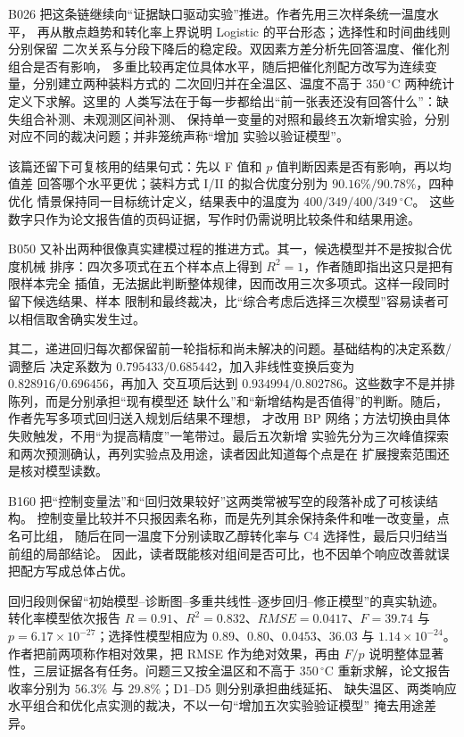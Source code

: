 B026 把这条链继续向“证据缺口驱动实验”推进。作者先用三次样条统一温度水平，
再从散点趋势和转化率上界说明 Logistic 的平台形态；选择性和时间曲线则分别保留
二次关系与分段下降后的稳定段。双因素方差分析先回答温度、催化剂组合是否有影响，
多重比较再定位具体水平，随后把催化剂配方改写为连续变量，分别建立两种装料方式的
二次回归并在全温区、温度不高于 $350\,^{\circ}\mathrm{C}$ 两种统计定义下求解。这里的
人类写法在于每一步都给出“前一张表还没有回答什么”：缺失组合补测、未观测区间补测、
保持单一变量的对照和最终五次新增实验，分别对应不同的裁决问题；并非笼统声称“增加
实验以验证模型”。

该篇还留下可复核用的结果句式：先以 F 值和 $p$ 值判断因素是否有影响，再以均值差
回答哪个水平更优；装料方式 I/II 的拟合优度分别为 $90.16\%/90.78\%$，四种优化
情景保持同一目标统计定义，结果表中的温度为 $400/349/400/349\,^{\circ}\mathrm{C}$。
这些数字只作为论文报告值的页码证据，写作时仍需说明比较条件和结果用途。

B050 又补出两种很像真实建模过程的推进方式。其一，候选模型并不是按拟合优度机械
排序：四次多项式在五个样本点上得到 $R^2=1$，作者随即指出这只是把有限样本完全
插值，无法据此判断整体规律，因而改用三次多项式。这样一段同时留下候选结果、样本
限制和最终裁决，比“综合考虑后选择三次模型”容易读者可以相信取舍确实发生过。

其二，递进回归每次都保留前一轮指标和尚未解决的问题。基础结构的决定系数/调整后
决定系数为 $0.795433/0.685442$，加入非线性变换后变为 $0.828916/0.696456$，再加入
交互项后达到 $0.934994/0.802786$。这些数字不是并排陈列，而是分别承担“现有模型还
缺什么”和“新增结构是否值得”的判断。随后，作者先写多项式回归送入规划后结果不理想，
才改用 BP 网络；方法切换由具体失败触发，不用“为提高精度”一笔带过。最后五次新增
实验先分为三次峰值探索和两次预测确认，再列实验点及用途，读者因此知道每个点是在
扩展搜索范围还是核对模型读数。

B160 把“控制变量法”和“回归效果较好”这两类常被写空的段落补成了可核读结构。
控制变量比较并不只报因素名称，而是先列其余保持条件和唯一改变量，点名可比组，
随后在同一温度下分别读取乙醇转化率与 C4 选择性，最后只归结当前组的局部结论。
因此，读者既能核对组间是否可比，也不因单个响应改善就误把配方写成总体占优。

回归段则保留“初始模型--诊断图--多重共线性--逐步回归--修正模型”的真实轨迹。
转化率模型依次报告 $R=0.91$、$R^2=0.832$、$RMSE=0.0417$、$F=39.74$ 与
$p=6.17\times10^{-27}$；选择性模型相应为 $0.89$、$0.80$、$0.0453$、$36.03$ 与
$1.14\times10^{-24}$。作者把前两项称作相对效果，把 RMSE 作为绝对效果，再由 $F/p$
说明整体显著性，三层证据各有任务。问题三又按全温区和不高于 $350\,^{\circ}\mathrm{C}$
重新求解，论文报告收率分别为 $56.3\%$ 与 $29.8\%$；D1--D5 则分别承担曲线延拓、
缺失温区、两类响应水平组合和优化点实测的裁决，不以一句“增加五次实验验证模型”
掩去用途差异。

